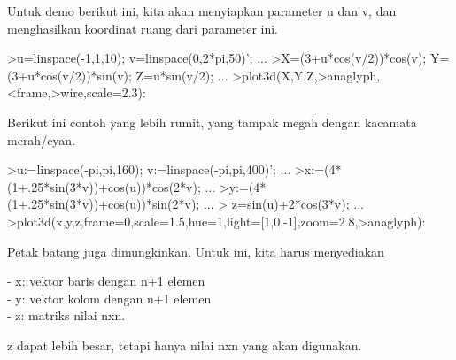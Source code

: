 \documentclass[12pt,Times new roman,letterpaper]{book}
\begin{document}
\begin{eulernootebook}
\begin{eulercomment}
\begin{eulercomment}
\begin{eulernootebook}
\begin{eulercomment}
\begin{eulercomment}
\begin{eulercomment}
\begin{eulercomment}
\begin{eulercomment}
\begin{eulercomment}
\begin{eulercomment}
\begin{eulernotebook}
\begin{eulercomment}
Untuk demo berikut ini, kita akan menyiapkan parameter u dan v, dan
menghasilkan koordinat ruang dari parameter ini.
\end{eulercomment}
\begin{eulerprompt}
>u=linspace(-1,1,10); v=linspace(0,2*pi,50)'; ...
>X=(3+u*cos(v/2))*cos(v); Y=(3+u*cos(v/2))*sin(v); Z=u*sin(v/2); ...
>plot3d(X,Y,Z,>anaglyph,<frame,>wire,scale=2.3):
\end{eulerprompt}
\begin{eulercomment}
Berikut ini contoh yang lebih rumit, yang tampak megah dengan kacamata
merah/cyan.
\end{eulercomment}
\begin{eulerprompt}
>u:=linspace(-pi,pi,160); v:=linspace(-pi,pi,400)';  ...
>x:=(4*(1+.25*sin(3*v))+cos(u))*cos(2*v); ...
>y:=(4*(1+.25*sin(3*v))+cos(u))*sin(2*v); ...
> z=sin(u)+2*cos(3*v); ...
>plot3d(x,y,z,frame=0,scale=1.5,hue=1,light=[1,0,-1],zoom=2.8,>anaglyph):
\end{eulerprompt}
\begin{eulercomment}
Petak batang juga dimungkinkan. Untuk ini, kita harus menyediakan

-   x: vektor baris dengan n+1 elemen\\
-   y: vektor kolom dengan n+1 elemen\\
-   z: matriks nilai nxn.

z dapat lebih besar, tetapi hanya nilai nxn yang akan digunakan.


\end{eulercomment}
\end{eulernotebook}
\end{eulercomment}
\end{eulercomment}
\end{eulercomment}
\end{eulercomment}
\end{eulercomment}
\end{eulercomment}
\end{eulercomment}
\end{eulernootebook}
\end{eulercomment}
\end{eulercomment}
\end{eulernootebook}
\end{document}
